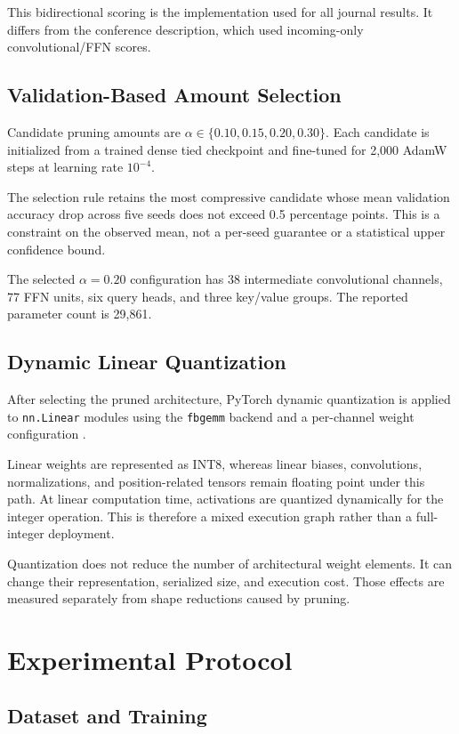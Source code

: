 \documentclass[journal]{IEEEtran}
\begin{document}
This bidirectional scoring is the implementation used for all
journal results.
It differs from the conference description, which used
incoming-only convolutional/FFN scores.

\subsection{Validation-Based Amount Selection}

Candidate pruning amounts are
$\alpha\in\{0.10,0.15,0.20,0.30\}$.
Each candidate is initialized from a trained dense tied checkpoint
and fine-tuned for 2,000 AdamW steps at learning rate $10^{-4}$.

The selection rule retains the most compressive candidate whose
mean validation accuracy drop across five seeds does not exceed
0.5 percentage points.
This is a constraint on the observed mean, not a per-seed
guarantee or a statistical upper confidence bound.

The selected $\alpha=0.20$ configuration has 38 intermediate
convolutional channels, 77 FFN units, six query heads, and three
key/value groups.
The reported parameter count is 29,861.

\subsection{Dynamic Linear Quantization}

After selecting the pruned architecture, PyTorch dynamic
quantization is applied to \texttt{nn.Linear} modules using
the \texttt{fbgemm} backend and a per-channel weight configuration
\cite{paszke2019pytorch}.

Linear weights are represented as INT8, whereas linear biases,
convolutions, normalizations, and position-related tensors remain
floating point under this path.
At linear computation time, activations are quantized dynamically
for the integer operation.
This is therefore a mixed execution graph rather than a
full-integer deployment.

Quantization does not reduce the number of architectural weight
elements.
It can change their representation, serialized size, and execution
cost.
Those effects are measured separately from shape reductions caused
by pruning.

\section{Experimental Protocol}

\subsection{Dataset and Training}
\end{document}
